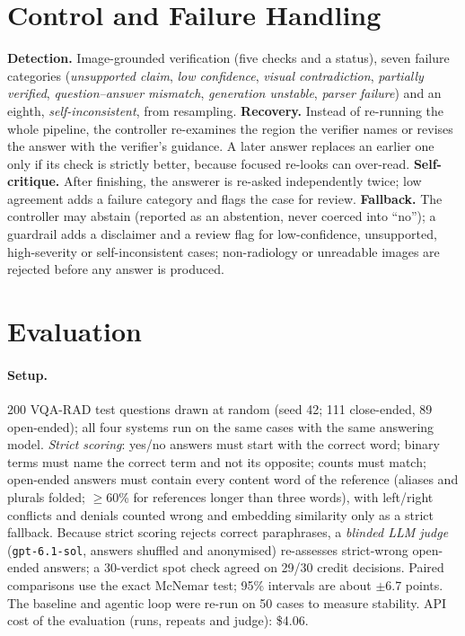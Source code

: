 \section{Control and Failure Handling}
\textbf{Detection.} Image-grounded verification (five checks and a status), seven failure categories
(\emph{unsupported claim}, \emph{low confidence}, \emph{visual contradiction}, \emph{partially verified},
\emph{question--answer mismatch}, \emph{generation unstable}, \emph{parser failure}) and an eighth,
\emph{self-inconsistent}, from resampling.
\textbf{Recovery.} Instead of re-running the whole pipeline, the controller re-examines the region the verifier
names or revises the answer with the verifier's guidance. A later answer replaces an earlier one only if its check
is strictly better, because focused re-looks can over-read.
\textbf{Self-critique.} After finishing, the answerer is re-asked independently twice; low agreement adds a failure
category and flags the case for review.
\textbf{Fallback.} The controller may abstain (reported as an abstention, never coerced into ``no''); a guardrail
adds a disclaimer and a review flag for low-confidence, unsupported, high-severity or self-inconsistent cases;
non-radiology or unreadable images are rejected before any answer is produced.

\section{Evaluation}
\paragraph{Setup.} 200 VQA-RAD test questions drawn at random (seed 42; 111 close-ended, 89 open-ended); all four
systems run on the same cases with the same answering model. \emph{Strict scoring}: yes/no answers must start with
the correct word; binary terms must name the correct term and not its opposite; counts must match; open-ended answers
must contain every content word of the reference (aliases and plurals folded; $\geq$60\% for references longer than
three words), with left/right conflicts and denials counted wrong and embedding similarity only as a strict
fallback. Because strict scoring rejects correct paraphrases, a \emph{blinded LLM judge} (\texttt{gpt-6.1-sol},
answers shuffled and anonymised) re-assesses strict-wrong open-ended answers; a 30-verdict spot check agreed on 29/30
credit decisions. Paired comparisons use the exact McNemar test; 95\% intervals are about $\pm$6.7 points. The
baseline and agentic loop were re-run on 50 cases to measure stability. API cost of the evaluation (runs, repeats and judge): \$4.06.

